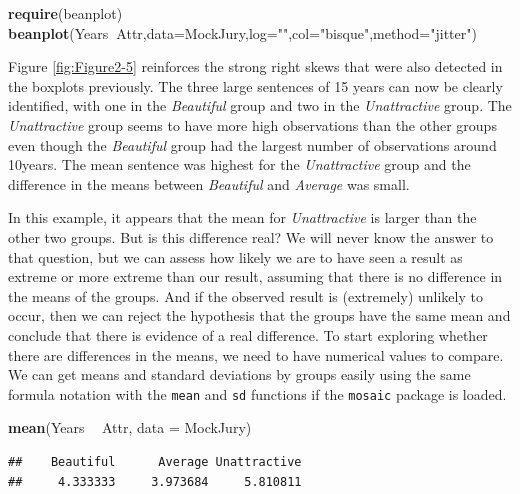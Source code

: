\documentclass[]{book}
\newenvironment{Shaded}{\begin{snugshade}}{\end{snugshade}}
\newcommand{\KeywordTok}[1]{\textcolor[rgb]{0.13,0.29,0.53}{\textbf{#1}}}
\newcommand{\DataTypeTok}[1]{\textcolor[rgb]{0.13,0.29,0.53}{#1}}
\newcommand{\StringTok}[1]{\textcolor[rgb]{0.31,0.60,0.02}{#1}}
\newcommand{\OperatorTok}[1]{\textcolor[rgb]{0.81,0.36,0.00}{\textbf{#1}}}
\newcommand{\NormalTok}[1]{#1}
\theoremstyle{definition}
\theoremstyle{definition}
\theoremstyle{remark}
\begin{document}
\begin{Shaded}
\begin{Highlighting}[]
\KeywordTok{require}\NormalTok{(beanplot)}
\KeywordTok{beanplot}\NormalTok{(Years}\OperatorTok{~}\NormalTok{Attr,}\DataTypeTok{data=}\NormalTok{MockJury,}\DataTypeTok{log=}\StringTok{""}\NormalTok{,}\DataTypeTok{col=}\StringTok{"bisque"}\NormalTok{,}\DataTypeTok{method=}\StringTok{"jitter"}\NormalTok{)}
\end{Highlighting}
\end{Shaded}

Figure \ref{fig:Figure2-5} reinforces the strong right skews that were
also detected in the boxplots previously. The three large sentences of
15 years can now be clearly identified, with one in the \emph{Beautiful}
group and two in the \emph{Unattractive} group. The \emph{Unattractive}
group seems to have more high observations than the other groups even
though the \emph{Beautiful} group had the largest number of observations
around 10years. The mean sentence was highest for the
\emph{Unattractive} group and the difference in the means between
\emph{Beautiful} and \emph{Average} was small.

In this example, it appears that the mean for \emph{Unattractive} is
larger than the other two groups. But is this difference real? We will
never know the answer to that question, but we can assess how likely we
are to have seen a result as extreme or more extreme than our result,
assuming that there is no difference in the means of the groups. And if
the observed result is (extremely) unlikely to occur, then we can reject
the hypothesis that the groups have the same mean and conclude that
there is evidence of a real difference. To start exploring whether there
are differences in the means, we need to have numerical values to
compare. We can get means and standard deviations by groups easily using
the same formula notation with the \texttt{mean} and \texttt{sd}
functions if the \texttt{mosaic} package is loaded.

\begin{Shaded}
\begin{Highlighting}[]
\KeywordTok{mean}\NormalTok{(Years }\OperatorTok{~}\StringTok{ }\NormalTok{Attr, }\DataTypeTok{data =}\NormalTok{ MockJury)}
\end{Highlighting}
\end{Shaded}

\begin{verbatim}
##    Beautiful      Average Unattractive 
##     4.333333     3.973684     5.810811
\end{verbatim}
\end{document}
